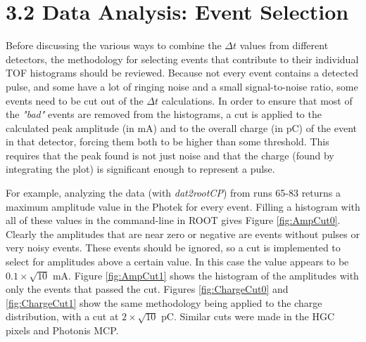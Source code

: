 \documentclass[12pt]{article}
\begin{document}
\section*{3.2 Data Analysis: Event Selection}
Before discussing the various ways to combine the $\Delta t$ values from different detectors, the methodology for selecting events that contribute to their individual TOF histograms should be reviewed.
Because not every event contains a detected pulse, and some have a lot of ringing noise and a small signal-to-noise ratio, some events need to be cut out of the $\Delta t$ calculations. 
In order to ensure that most of the \textit{"bad"} events are removed from the histograms, a cut is applied to the calculated peak amplitude (in mA) and to the overall charge (in pC) of the event in that detector, forcing them both to be higher than some threshold. 
This requires that the peak found is not just noise and that the charge (found by integrating the plot) is significant enough to represent a pulse.

For example, analyzing the data (with \textit{dat2rootCP}) from runs 65-83 returns a maximum amplitude value in the Photek for every event. 
Filling a histogram with all of these values in the command-line in ROOT gives Figure \ref{fig:AmpCut0}. 
Clearly the amplitudes that are near zero or negative are events without pulses or very noisy events. 
These events should be ignored, so a cut is implemented to select for amplitudes above a certain value. 
In this case the value appears to be $0.1\times\sqrt{10}$ mA. 
Figure \ref{fig:AmpCut1} shows the histogram of the amplitudes with only the events that passed the cut. 
Figures \ref{fig:ChargeCut0} and \ref{fig:ChargeCut1} show the same methodology being applied to the charge distribution, with a cut at $2\times\sqrt{10}$ pC. 
Similar cuts were made in the HGC pixels and Photonis MCP. 
\end{document}

